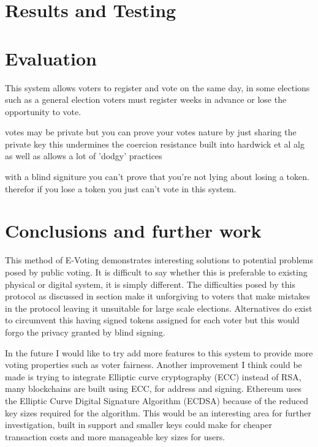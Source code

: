 \documentclass{entcs}
\begin{document}
\section{Results and Testing}


\section{Evaluation}\label{sec: Eval}
This system allows voters to register and vote on the same day, in some elections such as a general election voters must register weeks in advance or lose the opportunity to vote.

votes may be private but you can prove your votes nature by just sharing the private key this undermines the coercion resistance built into hardwick et al alg as well as allows a lot of 'dodgy' practices

with a blind signiture you can't prove that you're not lying about losing a token. therefor if you lose a token you just can't vote in this system.

\section{Conclusions and further work}
This method of E-Voting demonstrates interesting solutions to potential problems posed by public voting. It is difficult to say whether this is preferable to existing physical or digital system, it is simply different. The difficulties posed by this protocol as discussed in section \label{sec:eval} make it unforgiving to voters that make mistakes in the protocol leaving it unsuitable for large scale elections. Alternatives do exist to circumvent this having signed tokens assigned for each voter but this would forgo the privacy granted by blind signing. 

In the future I would like to try add more features to this system to provide more voting properties such as voter fairness. Another improvement I think could be made is trying to integrate Elliptic curve cryptography (ECC) instead of RSA, many blockchains are built using ECC, for address and signing. Ethereum uses the Elliptic Curve Digital Signature Algorithm (ECDSA) because of the reduced key sizes required for the algorithm. This would be an interesting area for further investigation, built in support and smaller keys could make for cheaper transaction costs and more manageable key sizes for users.
\printbibliography
\end{document}
